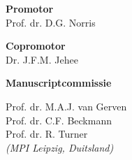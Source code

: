 {\setlength{\parindent}{0cm}\raggedright%

\newpage

\hspace{-12pt}\textbf{Promotor}\\
Prof. dr. D.G. Norris
\vspace{12pt}

\hspace{-12pt}\textbf{Copromotor}\\
Dr. J.F.M. Jehee
\vspace{20pt}

\hspace{-12pt}\textbf{Manuscriptcommissie}

\vspace{6pt}
Prof. dr. M.A.J. van Gerven\\

\vspace{6pt}
Prof. dr. C.F. Beckmann\\

\vspace{6pt}
Prof. dr. R. Turner\\
\emph{(MPI Leipzig, Duitsland)}

\vfill
}

\newpage


\thispagestyle{empty}

{\setlength{\parindent}{0cm}
\begin{flushright}
\end{flushright}
}

